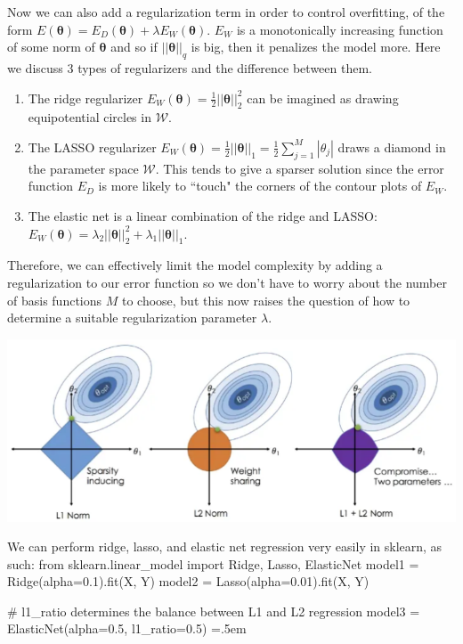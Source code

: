 \documentclass{article}
\newenvironment{cverbatim}
 {\SaveVerbatim{cverb}}
 {\endSaveVerbatim
  \flushleft\fboxrule=0pt\fboxsep=.5em
  \colorbox{cverbbg}{%
    \makebox[\dimexpr\linewidth-2\fboxsep][l]{\BUseVerbatim{cverb}}%
  }
  \endflushleft
}
\theoremstyle{definition}
\theoremstyle{remark}
\theoremstyle{definition}
\begin{document}
Now we can also add a regularization term in order to control overfitting, of the form $E(\boldsymbol{\theta}) = E_D (\boldsymbol{\theta}) + \lambda E_W (\boldsymbol{\theta})$. $E_W$ is a monotonically increasing function of some norm of $\boldsymbol{\theta}$ and so if $||\boldsymbol{\theta}||_q$ is big, then it penalizes the model more. Here we discuss 3 types of regularizers and the difference between them. 
\begin{enumerate}
    \item The ridge regularizer $E_W (\boldsymbol{\theta}) = \frac{1}{2} ||\boldsymbol{\theta}||_2^2$ can be imagined as drawing equipotential circles in $\mathcal{W}$. 

    \item The LASSO regularizer $E_W (\boldsymbol{\theta}) = \frac{1}{2} ||\boldsymbol{\theta}||_1 = \frac{1}{2} \sum_{j=1}^M |\theta_j|$ draws a diamond in the parameter space $\mathcal{W}$. This tends to give a sparser solution since the error function $E_D$ is more likely to ``touch" the corners of the contour plots of $E_W$. 

    \item The elastic net is a linear combination of the ridge and LASSO: $E_W (\boldsymbol{\theta}) = \lambda_2 ||\boldsymbol{\theta}||_2^2 + \lambda_1 ||\boldsymbol{\theta}||_1$. 
\end{enumerate}
Therefore, we can effectively limit the model complexity by adding a regularization to our error function so we don't have to worry about the number of basis functions $M$ to choose, but this now raises the question of how to determine a suitable regularization parameter $\lambda$. 
\begin{center}
    \includegraphics[scale=0.5]{Section_2/regularizers.png}
\end{center}

We can perform ridge, lasso, and elastic net regression very easily in sklearn, as such: 
\begin{cverbatim}
from sklearn.linear_model import Ridge, Lasso, ElasticNet
model1 = Ridge(alpha=0.1).fit(X, Y) 
model2 = Lasso(alpha=0.01).fit(X, Y)

# l1_ratio determines the balance between L1 and L2 regression
model3 = ElasticNet(alpha=0.5, l1_ratio=0.5) 
\end{cverbatim}
\end{document}
